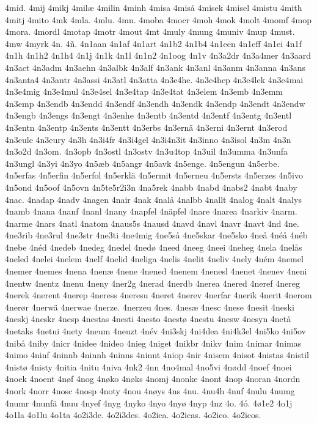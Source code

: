 4mid.
4mij
4mikj
4milæ
4milin
4minh
4misa
4miså
4misek
4misel
4mistu
4mith
4mitj
4mito
4mk
4mla.
4mlu.
4mn.
4moba
4mocr
4moh
4mok
4molt
4momf
4mop
4mora.
4mordl
4motap
4motr
4mout
4mt
4muly
4mung
4muniv
4mup
4must.
4mw
4myrk
4n.
4ñ.
4n1aan
4n1af
4n1art
4n1b2
4n1b4
4n1een
4n1eff
4n1ei
4n1f
4n1h
4n1h2
4n1h4
4n1j
4n1k
4n1l
4n1n2
4n1oog
4n1v
4n3a2dr
4n3a4mer
4n3aard
4n3act
4n3adm
4n3aehn
4n3albk
4n3alf
4n3ank
4n3anl
4n3anm
4n3anna
4n3ans
4n3anta4
4n3antr
4n3assi
4n3atl
4n3atta
4n3e4he.
4n3e4hep
4n3e4lek
4n3e4mai
4n3e4mig
4n3e4mul
4n3e4sel
4n3e4tap
4n3e4tat
4n3elem
4n3emb
4n3emm
4n3emp
4n3endb
4n3endd
4n3endf
4n3endh
4n3endk
4n3endp
4n3endt
4n3endw
4n3engb
4n3engs
4n3engt
4n3enhe
4n3entb
4n3entd
4n3entf
4n3entg
4n3entl
4n3entn
4n3entp
4n3ents
4n3entt
4n3erbs
4n3ernä
4n3erni
4n3ernt
4n3erod
4n3eule
4n3eury
4n3h
4n3i4fr
4n3i4gel
4n3i4n3it
4n3inno
4n3isol
4n3m
4n3n
4n3o2d
4n3om.
4n3opb
4n3ostl
4n3ostv
4n3u4top
4n3uil
4n3umma
4n3unfa
4n3ungl
4n3yi
4n3yo
4n5æb
4n5angr
4n5avk
4n5enge.
4n5engun
4n5erbe.
4n5erfas
4n5erfin
4n5erfol
4n5erklä
4n5ermit
4n5erneu
4n5ersts
4n5erzes
4n5ivo
4n5ond
4n5oof
4n5ovn
4n5te5r2i3n
4na5rek
4nabb
4nabd
4nabs2
4nabt
4naby
4nac.
4nadap
4nadv
4nagen
4nair
4nak
4nalå
4nalbb
4nallt
4nalog
4nalt
4nalys
4namb
4nana
4nanf
4nanl
4nany
4napfel
4näpfel
4nare
4narea
4narkiv
4narm.
4narme
4nars
4natl
4natom
4naus5s
4nausd
4navd
4navl
4navr
4navt
4nd
4ne.
4ne3rib
4ne3rul
4ne3str
4ne3ti
4ne4mig
4ne5så
4ne5skar
4ne5sko
4neå
4néå
4néb
4nebe
4néd
4nedeb
4nedeg
4nedel
4nedø
4need
4neeg
4neei
4neheg
4nela
4nelås
4neled
4nelei
4nelem
4nelf
4nelid
4neliga
4nelis
4nelit
4neliv
4nely
4ném
4nemel
4nemer
4nemes
4nena
4nenæ
4nene
4nened
4nenem
4nenesl
4nenet
4nenev
4neni
4nentw
4nentz
4nenu
4neny
4ner2g
4nerad
4nerdb
4nerea
4nered
4neref
4nereg
4nerek
4nerent
4nerep
4neress
4neresu
4neret
4nerev
4nerfar
4nerik
4nerit
4nerom
4nerør
4nerwä
4nerwae
4nerze.
4nerzeu
4nes.
4nesæ
4nesc
4nese
4nesit
4neski
4neskj
4neskr
4nesp
4nestas
4nesti
4nesto
4nestø
4nestu
4nesw
4nesyn
4netå
4netaks
4netui
4nety
4neum
4neuzt
4név
4ni3skj
4ni4dea
4ni4k3el
4ni5ko
4ni5ov
4nibå
4niby
4nicr
4nidee
4nideo
4nieg
4niget
4nikbr
4nikv
4nim
4nimar
4nimas
4nimo
4ninf
4ninnb
4ninnh
4ninns
4ninnt
4niop
4nir
4nisem
4nisot
4nistas
4nistil
4nistø
4nisty
4nitia
4nitu
4niva
4nk2
4nn
4no4mal
4no5vi
4nødd
4noef
4noei
4noek
4noent
4nøf
4nog
4nøko
4nøks
4nomj
4nonke
4nont
4nop
4noran
4nordn
4nork
4norr
4nosc
4nosp
4noty
4nou
4nøys
4ns
4nu.
4nu4h
4nuf
4nulu
4numg
4numr
4nunfä
4nuu
4nyef
4nyg
4nyko
4nyo
4nyø
4nyp
4nz
4o.
4ó.
4ø1e2
4o1j
4o1la
4o1lu
4o1ta
4o2i3de.
4o2i3des.
4o2ica.
4o2icas.
4o2ico.
4o2icos.
